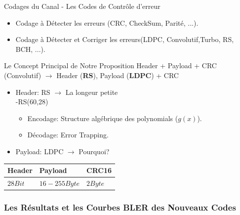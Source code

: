 \documentclass[8pt]{beamer}
\newcommand{\1}{\mathbbm 1}
\begin{document}
\begin{frame}{Codages du Canal}
- Les Codes de Contrôle d'erreur 
\begin{itemize}
\item Codage à Détecter les erreurs (CRC, CheckSum, Parité, ...).
\item Codage à Détecter et Corriger les erreurs(LDPC, Convolutif,Turbo, RS, BCH, ...).
\end{itemize}
\begin{block}{Le Concept Principal de Notre Proposition}
Header + Payload + CRC (Convolutif) $\rightarrow$ Header (\textbf{RS}), Payload (\textbf{LDPC}) + CRC 
\begin{itemize}
\item Header: RS $\rightarrow$ La longeur petite
\\-RS(60,28)
\begin{itemize}
\item Encodage: Structure algébrique des polynomials ($g(x)$).
\item Décodage: Error Trapping.
\end{itemize}
\item Payload: LDPC  $\rightarrow$ Pourquoi? 
 
\end{itemize}
\begin{table}
\begin{center}
    \begin{tabular}{| l | l | l |}
    \hline
     Header & Payload & CRC16 \\ \hline
        $ 28 Bit $ & $16-255 Byte$ & $2 Byte$ \\ \hline   
     \end{tabular}
    \end{center}
\end{table}

\end{block}

\end{frame}

\subsubsection{Les Résultats et les Courbes BLER des Nouveaux Codes}
\end{document}
